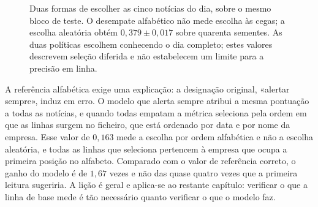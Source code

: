 \begin{figure}[htbp]
\centering
{}
\caption[O desempate alfabético não é uma referência aleatória]{Duas formas de escolher as cinco
notícias do dia, sobre o mesmo bloco de teste. O desempate alfabético não mede escolha às cegas;
a escolha aleatória obtém $0{,}379 \pm 0{,}017$ sobre
quarenta sementes. As duas políticas escolhem conhecendo o dia completo; estes valores descrevem
seleção diferida e não estabelecem um limite para a precisão em linha.}
\label{fig:av_orcamento}
\end{figure}

A referência alfabética exige uma explicação: a designação original, «alertar sempre», induz em erro. O modelo que
alerta sempre atribui a mesma pontuação a todas as notícias, e quando todas empatam a métrica
seleciona pela ordem em que as linhas surgem no ficheiro, que está ordenado por data e por nome da
empresa. Esse valor de $0{,}163$ mede a escolha por ordem alfabética e não a escolha aleatória, e
todas as linhas que seleciona pertencem à empresa que ocupa a primeira posição no alfabeto. Comparado
com o valor de referência correto, o ganho do modelo é de $1{,}67$ vezes e não das quase quatro vezes
que a primeira leitura sugeriria. A lição é geral e aplica-se ao restante capítulo: verificar o que a
linha de base mede é tão necessário quanto verificar o que o modelo faz.

